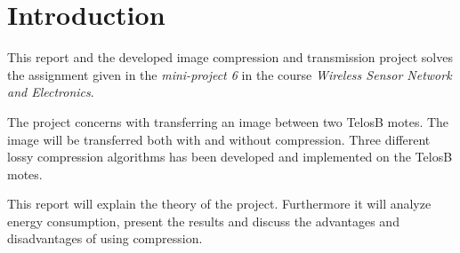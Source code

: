 \chapter{Introduction}
\label{chp:intro}

This report and the developed image compression and transmission project solves the assignment given in the \emph{mini-project 6} in the course \emph{Wireless Sensor Network and Electronics}.

The project concerns with transferring an image between two TelosB motes. The image will be transferred both with and without compression. Three different lossy compression algorithms has been developed and implemented on the TelosB motes. 

This report will explain the theory of the project. Furthermore it will analyze energy consumption, present the results and discuss the advantages and disadvantages of using compression.